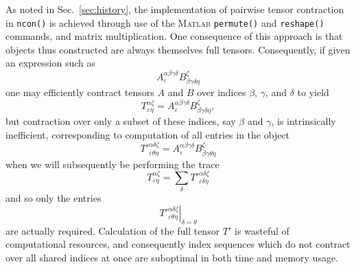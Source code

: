\documentclass[aps,prb,reprint,superscriptaddress,amsmath,amsfonts]{revtex4-1}
\theoremstyle{definition}
\newcommand{\sref}[1]{Sec.~\ref{#1}}
\newcommand{\MATLAB}{\textsc{Matlab}}
\newcommand{\ttt}[1]{\texttt{#1}}
\begin{document}
As noted in \sref{sec:history}, the implementation of pairwise tensor contraction in \ttt{ncon()} is achieved through use of the \MATLAB{} \ttt{permute()} and \ttt{reshape()} commands, and matrix multiplication. %
One consequence of this approach is that objects thus constructed are always themselves full tensors. Consequently, if given an expression such as
\begin{equation}
A^{\alpha\beta\gamma\delta}_\varepsilon B^\zeta_{\beta\gamma\delta\eta}
\end{equation}
one may efficiently contract tensors $A$ and $B$ over indices $\beta$, $\gamma$, and $\delta$ to yield
\begin{equation}
T^{\alpha\zeta}_{\varepsilon\eta} = A^{\alpha\beta\gamma\delta}_\varepsilon B^\zeta_{\beta\gamma\delta\eta},
\end{equation}
but contraction over only a subset of these indices, say $\beta$ and $\gamma$, is intrinsically inefficient, corresponding to computation of all entries in the object
\begin{equation}
T'{}^{\alpha\delta\zeta}_{\varepsilon\theta\eta} = A^{\alpha\beta\gamma\delta}_\varepsilon B^\zeta_{\beta\gamma\theta\eta}
\end{equation}
when we will subsequently be performing the trace
\begin{equation}
T^{\alpha\zeta}_{\varepsilon\eta} = \sum_\delta T'{}^{\alpha\delta\zeta}_{\varepsilon\delta\eta}
\end{equation}
and so only the entries
\begin{equation}
\left.T'{}^{\alpha\delta\zeta}_{\varepsilon\theta\eta}\right|_{\delta=\theta}
\end{equation}
are actually required.
Calculation of the full tensor $T'$ is wasteful of computational resources, and consequently index sequences which do not contract over all shared indices at once are %
suboptimal in both time and memory usage.
\end{document}
